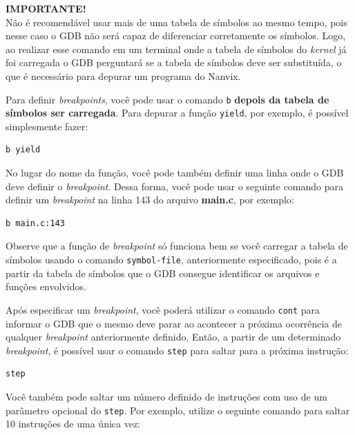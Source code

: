 \documentclass[11pt]{article}
\newcommand*{\alert}[1]{\vspace{0.4cm}\colorbox{gray!60!white}{\parbox{0.92\linewidth}{{\centering \textbf{IMPORTANTE!}\\}#1}}\vspace{0.4cm}}
\begin{document}
\alert{Não é recomendável usar mais de uma tabela de símbolos ao mesmo tempo, pois nesse caso o GDB não será capaz de diferenciar corretamente os símbolos. Logo, ao realizar esse comando em um terminal onde a tabela de símbolos do \textit{kernel} já foi carregada o GDB perguntará se a tabela de símbolos deve ser substituída, o que é necessário para depurar um programa do Nanvix.}

Para definir \textit{breakpoints}, você pode usar o comando \texttt{b} \textbf{depois da tabela de símbolos ser carregada}. Para depurar a função \texttt{yield}, por exemplo, é possível simplesmente fazer:\\

\begin{lstlisting}[language=sh,numbers=none,frame=single]
b yield
\end{lstlisting}

\vspace{0.3cm}
No lugar do nome da função, você pode também definir uma linha onde o GDB deve definir o \textit{breakpoint}. Dessa forma, você pode usar o seguinte comando para definir um \textit{breakpoint} na linha 143 do arquivo \textbf{main.c}, por exemplo:\\

\begin{lstlisting}[language=sh,numbers=none,frame=single]
b main.c:143
\end{lstlisting}

\vspace{0.3cm}
Observe que a função de \textit{breakpoint} só funciona bem se você carregar a tabela de símbolos usando o comando \texttt{symbol-file}, anteriormente especificado, pois é a partir da tabela de símbolos que o GDB consegue identificar os arquivos e funções envolvidos.

Após especificar um \textit{breakpoint}, você poderá utilizar o comando \texttt{cont} para informar o GDB que o mesmo deve parar ao acontecer a próxima ocorrência de qualquer \textit{breakpoint} anteriormente definido. Então, a partir de um determinado \textit{breakpoint}, é possível usar o comando  \texttt{step} para saltar para a próxima instrução:\\

\begin{lstlisting}[language=sh,numbers=none,frame=single]
step
\end{lstlisting}

\vspace{0.3cm}
Você também pode saltar um número definido de instruções com uso de um parâmetro opcional do \texttt{step}. Por exemplo, utilize o seguinte comando para saltar 10 instruções de uma única vez:\\
\end{document}
